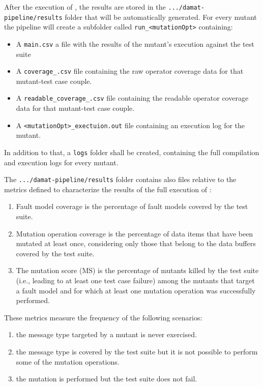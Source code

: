 After the execution of \DAMA, the results are stored in the \texttt{.../damat-pipeline/results} folder that will be automatically generated.
For every mutant the pipeline will create a subfolder called \texttt{run\_<mutationOpt>} containing:
\begin{itemize}
	\item A \texttt{main.csv} a file with the results of the mutant's execution against the test suite
	\item A \texttt{coverage\_<test case>.csv} file containing the raw operator coverage data for that mutant-test case couple.
	\item A \texttt{readable\_coverage\_<test case>.csv} file containing the readable operator coverage data for that mutant-test case couple.
	\item A \texttt{<mutationOpt>\_exectuion.out} file containing an execution log for the mutant.
\end{itemize}

In addition to that, a \texttt{logs} folder shall be created, containing the full compilation and execution logs for every mutant.

The \texttt{.../damat-pipeline/results} folder contains also files relative to the metrics defined to characterize the results of the full execution of \DAMA:

\begin{enumerate}
	\item Fault model coverage is the percentage of fault models covered by the test suite.
	\item Mutation operation coverage is the percentage of data items that have been mutated at least once, considering only those that belong to the data buffers covered by the test suite.
	\item The mutation score (MS) is the percentage of mutants killed by the test suite (i.e., leading to at least one test case failure) among the mutants that target a fault model and for which at least one mutation operation was successfully performed.
\end{enumerate}

These metrics measure the frequency of the following scenarios:
\begin{enumerate}
	\item the message type targeted by a mutant is never exercised.
	\item the message type is covered by the test suite but it is not possible to perform some of the mutation operations.
	\item the mutation is performed but the test suite does not fail.
\end{enumerate}

